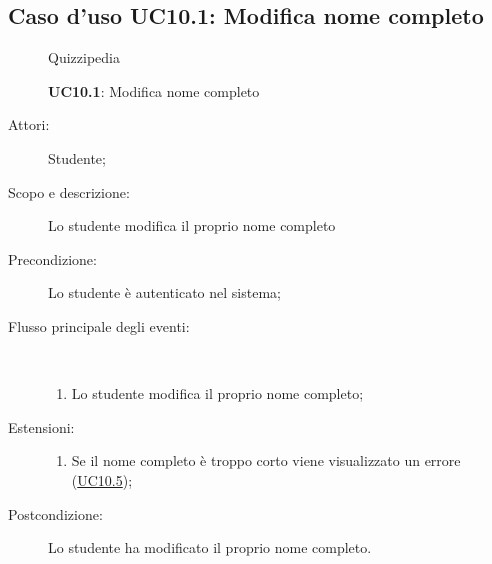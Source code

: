 \subsection{Caso d'uso UC10.1: Modifica nome completo}
\begin{figure}[H]
	\centering
	\begin{resizedtikzpicture}{\textwidth}
		\begin{umlsystem}[x=0, fill=lightgray!20]{Quizzipedia}
		\end{umlsystem}
	\end{resizedtikzpicture}
	\caption{\textbf{UC10.1}: Modifica nome completo}
	\label{UC10.1}
\end{figure}
\begin{description}
	\item[Attori:] Studente;
	\item[Scopo e descrizione:] Lo studente modifica il proprio nome completo
	\item[Precondizione:] Lo studente è autenticato nel sistema;
	
	\item[Flusso principale degli eventi:] \ 
	\begin{enumerate}
		\item Lo studente modifica il proprio nome completo;
		
	\end{enumerate}
	\item[Estensioni:]
	\begin{enumerate}
		\item Se il nome completo è troppo corto viene visualizzato un errore (\hyperlink{UC10.5}{UC10.5});
		
	\end{enumerate}
	\item[Postcondizione:] Lo studente ha modificato il proprio nome completo.
\end{description}
\hypertarget{UC10.2}{}

